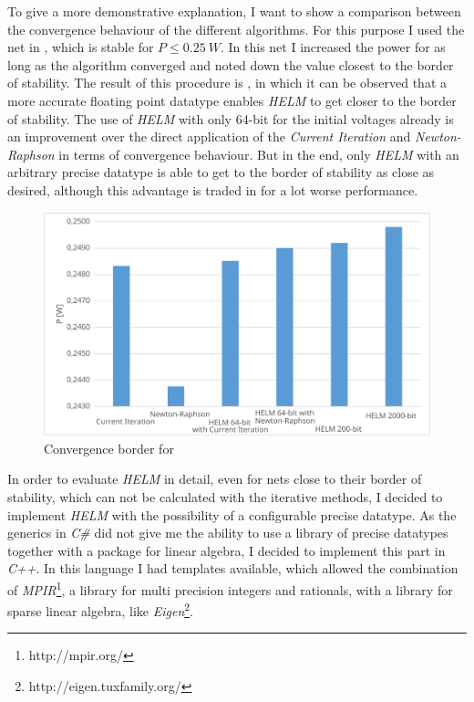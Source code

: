 To give a more demonstrative explanation, I want to show a comparison between the convergence behaviour of the different algorithms. For this purpose I used the net in , which is stable for $P \le \SI{0.25}{W}$. In this net I increased the power for as long as the algorithm converged and noted down the value closest to the border of stability. The result of this procedure is , in which it can be observed that a more accurate floating point datatype enables \emph{HELM} to get closer to the border of stability. The use of \emph{HELM} with only 64-bit for the initial voltages already is an improvement over the direct application of the \emph{Current Iteration} and \emph{Newton-Raphson} in terms of convergence behaviour. But in the end, only \emph{HELM} with an arbitrary precise datatype is able to get to the border of stability as close as desired, although this advantage is traded in for a lot worse performance.

\begin{figure}
	\centering
	\includegraphics[scale=0.7]{figures/convergence_border}
	\caption{Convergence border for }
	\label{fig:convergence_border}
\end{figure}

In order to evaluate \emph{HELM} in detail, even for nets close to their border of stability, which can not be calculated with the iterative methods, I decided to implement \emph{HELM} with the possibility of a configurable precise datatype. As the generics in \emph{C\#} did not give me the ability to use a library of precise datatypes together with a package for linear algebra, I decided to implement this part in \emph{C++}. In this language I had templates available, which allowed the combination of \emph{MPIR}\footnote{http://mpir.org/}, a library for multi precision integers and rationals, with a library for sparse linear algebra, like \emph{Eigen}\footnote{http://eigen.tuxfamily.org/}.

